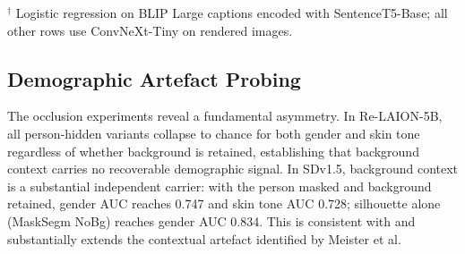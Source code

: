 \begin{table}[h]
	\centering
	\small
	\vspace{0.25em}
	\begin{minipage}{\columnwidth}
		\footnotesize $^\dagger$ Logistic regression on BLIP Large captions encoded with SentenceT5-Base; all other rows use ConvNeXt-Tiny on rendered images.
	\end{minipage}
	\caption{Dataset-source classification results for the three-class Re-LAION-5B / SDv1.5 / COCO task.}
	\label{tab:dataset_classification_summary}
\end{table}

\subsection{Demographic Artefact Probing}

The occlusion experiments reveal a fundamental asymmetry. In Re-LAION-5B, all
person-hidden variants collapse to chance for both gender and skin tone regardless of
whether background is retained, establishing that background context carries no
recoverable demographic signal. In SDv1.5, background context is a substantial
independent carrier: with the person masked and background retained, gender AUC reaches
0.747 and skin tone AUC 0.728; silhouette alone (MaskSegm NoBg) reaches gender AUC
0.834. This is consistent with and substantially extends the contextual artefact
identified by Meister et al.

